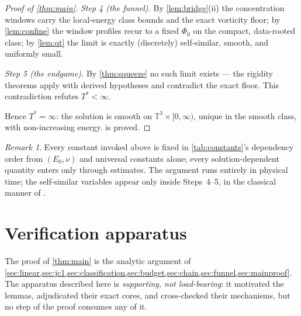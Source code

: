 \documentclass[11pt,letterpaper]{amsart}
\theoremstyle{definition}
\theoremstyle{remark}
\newtheorem{remark}[theorem]{Remark}
\newcommand{\TT}{\mathbb{T}}
\begin{document}
\begin{proof}[Proof of \cref{thm:main}]
\emph{Step 4 (the funnel).} By \cref{lem:bridge}\textup{(ii)} the
concentration windows carry the local-energy class bounds and the exact
vorticity floor; by \cref{lem:confine} the window profiles recur to a fixed
$\Phi_0$ on the compact, data-rooted class; by \cref{lem:qt} the limit is
exactly (discretely) self-similar, smooth, and uniformly small.

\emph{Step 5 (the endgame).} By \cref{thm:squeeze} no such limit exists ---
the rigidity theorems apply with derived hypotheses and contradict the exact
floor. This contradiction refutes $T^*<\infty$.

Hence $T^*=\infty$: the solution is smooth on $\TT^3\times[0,\infty)$, unique in the
smooth class, with non-increasing energy.  is proved.
\end{proof}

\begin{remark}
Every constant invoked above is fixed in \cref{tab:constants}'s dependency order from
$(E_0,\nu)$ and universal constants alone; every solution-dependent quantity enters
only through estimates. The argument runs entirely in physical time; the self-similar
variables appear only inside Steps~4--5, in the classical manner of
\cite{CKN1982,NRS1996,Tsai1998}.
\end{remark}

\section{Verification apparatus}\label{sec:verification}

The proof of \cref{thm:main} is the analytic argument of
\cref{sec:linear,sec:jc1,sec:classification,sec:budget,sec:chain,sec:funnel,sec:mainproof}.
The apparatus described here is \emph{supporting, not load-bearing}: it motivated the
lemmas, adjudicated their exact cores, and cross-checked their mechanisms, but no step
of the proof consumes any of it.
\end{document}
